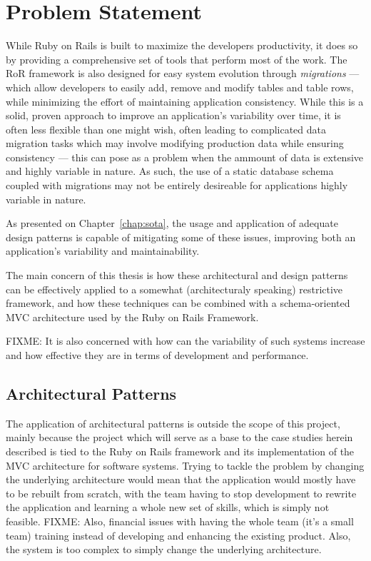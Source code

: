 \chapter{Problem Statement}\label{chap:problem_statement}

While Ruby on Rails is built to maximize the developers productivity, it does so by providing a comprehensive set of tools that perform most of the work. The RoR framework is also designed for easy system evolution through \emph{migrations} --- which allow developers to easily add, remove and modify tables and table rows, while minimizing the effort of maintaining application consistency. While this is a solid, proven approach to improve an application's variability over time, it is often less flexible than one might wish, often leading to complicated data migration tasks which may involve modifying production data while ensuring consistency --- this can pose as a problem when the ammount of data is extensive and highly variable in nature. As such, the use of a static database schema coupled with migrations may not be entirely desireable for applications highly variable in nature.

As presented on Chapter~\ref{chap:sota}, the usage and application of adequate design patterns is capable of mitigating some of these issues, improving both an application's variability and maintainability.

The main concern of this thesis is how these architectural and design patterns can be effectively applied to a somewhat (architecturaly speaking) restrictive framework, and how these techniques can be combined with a schema-oriented MVC architecture used by the Ruby on Rails Framework.

FIXME: It is also concerned with how can the variability of such systems increase and how effective they are in terms of development and performance.

\section{Architectural Patterns}\label{sec:architectural_patterns}

The application of architectural patterns is outside the scope of this project, mainly because the project which will serve as a base to the case studies herein described is tied to the Ruby on Rails framework and its implementation of the MVC architecture for software systems. Trying to tackle the problem by changing the underlying architecture would mean that the application would mostly have to be rebuilt from scratch, with the team having to stop development to rewrite the application and learning a whole new set of skills, which is simply not feasible. FIXME: Also, financial issues with having the whole team (it's a small team) training instead of developing and enhancing the existing product. Also, the system is too complex to simply change the underlying architecture. %


